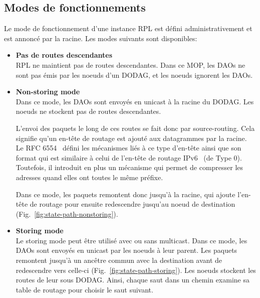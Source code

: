 \subsection*{Modes de fonctionnements}\label{subsec:state-mop}
    Le mode de fonctionnement d'une instance RPL est défini administrativement et est annoncé par la racine. Les modes suivants sont disponibles:
    \begin{itemize}
        \item \textbf{Pas de routes descendantes}\\
            RPL ne maintient pas de routes descendantes. Dans ce MOP, les DAOs ne sont pas émis par les noeuds d'un DODAG, et les noeuds ignorent les DAOs.
        \item \textbf{Non-storing mode}\\
            Dans ce mode, les DAOs sont envoyés en unicast à la racine du DODAG.
            Les noeuds ne stockent pas de routes descendantes.
            
            L'envoi des paquets le long de ces routes se fait donc par source-routing. Cela signifie qu'un en-tête de routage est ajouté aux datagrammes par la racine. Le RFC 6554~\cite{rfc:rpl-routing-header} défini les mécanismes liés à ce type d'en-tête ainsi que son format qui est similaire à celui de l'en-tête de routage IPv6~\cite{rfc:ipv6} (de Type 0). Toutefois, il introduit en plus un mécanisme qui permet de compresser les adresses quand elles ont toutes le même préfixe.

            Dans ce mode, les paquets remontent donc jusqu'à la racine, qui ajoute l'en-tête de routage pour ensuite redescendre jusqu'au noeud de destination (Fig.~\ref{fig:state-path-nonstoring}).
        \item \textbf{Storing mode}\\
            Le storing mode peut être utilisé avec ou sans multicast.
            Dans ce mode, les DAOs sont envoyés en unicast par les noeuds à leur parent.
            Les paquets remontent jusqu'à un ancêtre commun avec la destination avant de redescendre vers celle-ci (Fig.~\ref{fig:state-path-storing}).
            Les noeuds stockent les routes de leur sous DODAG. Ainsi, chaque saut dans un chemin examine sa table de routage pour choisir le saut suivant.
    \end{itemize}
    
